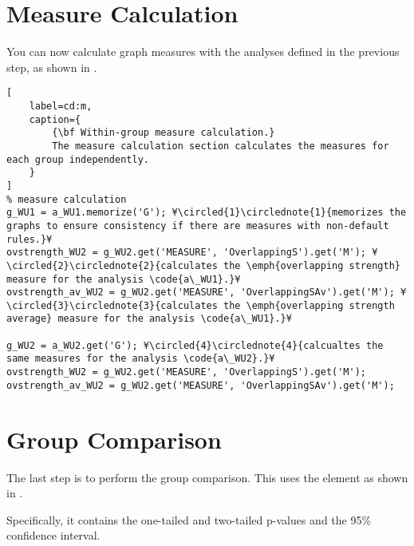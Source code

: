 \documentclass{tufte-handout}
\begin{document}
\section{Measure Calculation}

You can now calculate graph measures with the analyses defined in the previous step, as shown in .

\begin{lstlisting}[
	label=cd:m,
	caption={
		{\bf Within-group measure calculation.}
		The measure calculation section calculates the measures for each group independently.
	}
]
% measure calculation
g_WU1 = a_WU1.memorize('G'); ¥\circled{1}\circlednote{1}{memorizes the graphs to ensure consistency if there are measures with non-default rules.}¥
ovstrength_WU2 = g_WU2.get('MEASURE', 'OverlappingS').get('M'); ¥\circled{2}\circlednote{2}{calculates the \emph{overlapping strength} measure for the analysis \code{a\_WU1}.}¥
ovstrength_av_WU2 = g_WU2.get('MEASURE', 'OverlappingSAv').get('M'); ¥\circled{3}\circlednote{3}{calculates the \emph{overlapping strength average} measure for the analysis \code{a\_WU1}.}¥

g_WU2 = a_WU2.get('G'); ¥\circled{4}\circlednote{4}{calcualtes the same measures for the analysis \code{a\_WU2}.}¥
ovstrength_WU2 = g_WU2.get('MEASURE', 'OverlappingS').get('M');
ovstrength_av_WU2 = g_WU2.get('MEASURE', 'OverlappingSAv').get('M');
\end{lstlisting}

\section{Group Comparison}

The last step is to perform the group comparison. This uses the element  as shown in .

Specifically, it contains the one-tailed and two-tailed p-values and the 95\% confidence interval.
\end{document}
